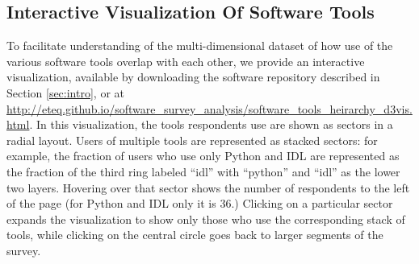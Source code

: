 \subsection{Interactive Visualization Of Software Tools}
\label{ssec:d3viz}

To facilitate understanding of the multi-dimensional dataset of how use of the various software tools overlap with each other, we provide an interactive visualization, available by downloading the software repository described in Section \ref{sec:intro}, or at \url{http://eteq.github.io/software_survey_analysis/software_tools_heirarchy_d3vis.html}. In this visualization, the tools respondents use are shown as sectors in a radial layout.  Users of multiple tools are represented as stacked sectors: for example, the fraction of users who use only Python and IDL are represented as the fraction of the third ring labeled ``idl'' with ``python'' and ``idl'' as the lower two layers.  Hovering over that sector shows the number of respondents to the left of the page (for Python and IDL only it is 36.)  Clicking on a particular sector expands the visualization to show only those who use the corresponding stack of tools, while clicking on the central circle goes back to larger segments of the survey.